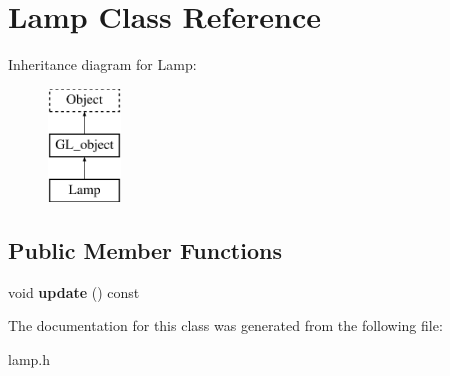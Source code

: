 \hypertarget{class_lamp}{
\section{Lamp Class Reference}
\label{class_lamp}
}
Inheritance diagram for Lamp:\begin{figure}[H]
\begin{center}
\leavevmode
\includegraphics[height=3.000000cm]{class_lamp}
\end{center}
\end{figure}
\subsection*{Public Member Functions}
\begin{DoxyCompactItemize}
\item 
\hypertarget{class_lamp_a180fd208a23fbf914f3276304d0a9325}{
void {\bfseries update} () const }
\label{class_lamp_a180fd208a23fbf914f3276304d0a9325}

\end{DoxyCompactItemize}


The documentation for this class was generated from the following file:\begin{DoxyCompactItemize}
\item 
lamp.h\end{DoxyCompactItemize}
